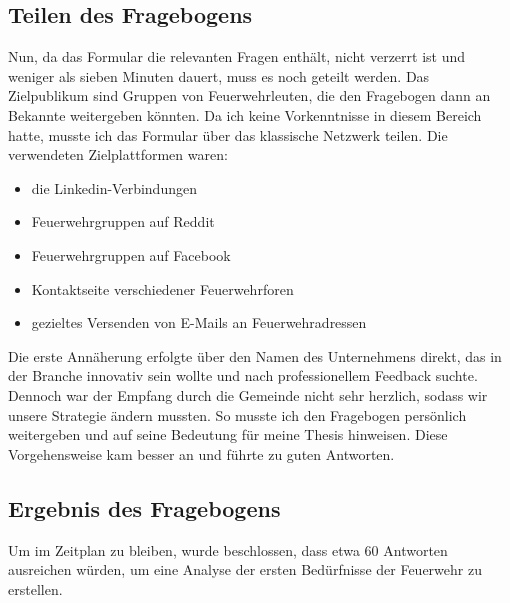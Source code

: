 \subsection{Teilen des Fragebogens}

Nun, da das Formular die relevanten Fragen enthält, nicht verzerrt ist und weniger als sieben Minuten dauert, muss es noch geteilt werden.
Das Zielpublikum sind Gruppen von Feuerwehrleuten, die den Fragebogen dann an Bekannte weitergeben könnten.
Da ich keine Vorkenntnisse in diesem Bereich hatte, musste ich das Formular über das klassische Netzwerk teilen.
Die verwendeten Zielplattformen waren:

\begin{itemize}
  \item die Linkedin-Verbindungen
  \item Feuerwehrgruppen auf Reddit
  \item Feuerwehrgruppen auf Facebook
  \item Kontaktseite verschiedener Feuerwehrforen
  \item gezieltes Versenden von E-Mails an Feuerwehradressen
\end{itemize}

Die erste Annäherung erfolgte über den Namen des Unternehmens direkt, das in der Branche innovativ sein wollte und nach professionellem Feedback suchte.
Dennoch war der Empfang durch die Gemeinde nicht sehr herzlich, sodass wir unsere Strategie ändern mussten.
So musste ich den Fragebogen persönlich weitergeben und auf seine Bedeutung für meine Thesis hinweisen.
Diese Vorgehensweise kam besser an und führte zu guten Antworten.

\subsection{Ergebnis des Fragebogens}

Um im Zeitplan zu bleiben, wurde beschlossen, dass etwa 60 Antworten ausreichen würden, um eine Analyse der ersten Bedürfnisse der Feuerwehr zu erstellen.
